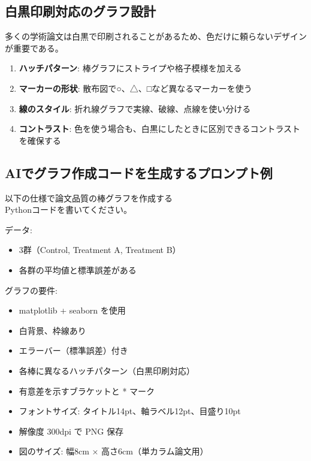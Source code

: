 \subsection{白黒印刷対応のグラフ設計}

多くの学術論文は白黒で印刷されることがあるため、色だけに頼らないデザインが重要である。

\begin{enumerate}
\item \textbf{ハッチパターン}: 棒グラフにストライプや格子模様を加える
\item \textbf{マーカーの形状}: 散布図で○、△、□など異なるマーカーを使う
\item \textbf{線のスタイル}: 折れ線グラフで実線、破線、点線を使い分ける
\item \textbf{コントラスト}: 色を使う場合も、白黒にしたときに区別できるコントラストを確保する
\end{enumerate}

\subsection{AIでグラフ作成コードを生成するプロンプト例}

\begin{promptbox}
以下の仕様で論文品質の棒グラフを作成する\\
Pythonコードを書いてください。

データ:
\begin{itemize}
\item 3群（Control, Treatment A, Treatment B）
\item 各群の平均値と標準誤差がある
\end{itemize}

グラフの要件:
\begin{itemize}
\item matplotlib + seaborn を使用
\item 白背景、枠線あり
\item エラーバー（標準誤差）付き
\item 各棒に異なるハッチパターン（白黒印刷対応）
\item 有意差を示すブラケットと * マーク
\item フォントサイズ: タイトル14pt、軸ラベル12pt、目盛り10pt
\item 解像度 300dpi で PNG 保存
\item 図のサイズ: 幅8cm × 高さ6cm（単カラム論文用）
\end{itemize}
\end{promptbox}

